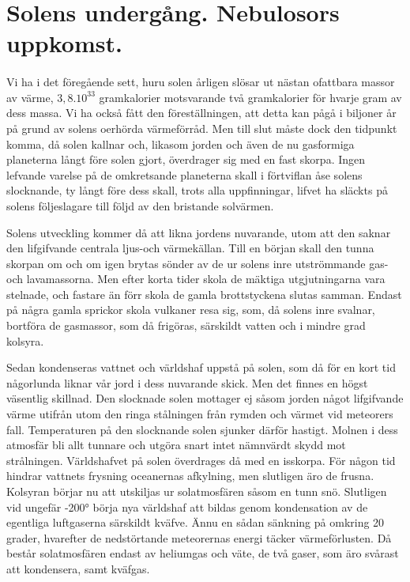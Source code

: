 \documentclass[a4paper, 12pt, oneside, swedish]{article}
\begin{document}
\section{Solens undergång. Nebulosors uppkomst.}
\paragraph{}
Vi ha i det föregående sett, huru solen årligen slösar ut nästan ofattbara massor av värme, $3,8.10^{33}$ gramkalorier motsvarande två gramkalorier för hvarje gram av dess massa. Vi ha också fått den föreställningen, att detta kan pågå i biljoner år på grund av solens oerhörda värmeförråd. Men till slut måste dock den tidpunkt komma, då solen kallnar och, likasom jorden och även de nu gasformiga planeterna långt före solen gjort, överdrager sig med en fast skorpa. Ingen lefvande varelse på de omkretsande planeterna skall i förtviflan åse solens slocknande, ty långt före dess skall, trots alla uppfinningar, lifvet ha släckts på solens följeslagare till följd av den bristande solvärmen.

Solens utveckling kommer då att likna jordens nuvarande, utom att den saknar den lifgifvande centrala ljus-och värmekällan. Till en början skall den tunna skorpan om och om igen brytas sönder av de ur solens inre utströmmande gas- och lavamassorna. Men efter korta tider skola de mäktiga utgjutningarna vara stelnade, och fastare än förr skola de gamla brottstyckena slutas samman. Endast på några gamla sprickor skola vulkaner resa sig, som, då solens inre svalnar, bortföra de gasmassor, som då frigöras, särskildt vatten och i mindre grad kolsyra.

Sedan kondenseras vattnet och världshaf uppstå på solen, som då för en kort tid någorlunda liknar vår jord i dess nuvarande skick. Men det finnes en högst väsentlig skillnad. Den slocknade solen mottager ej såsom jorden något lifgifvande värme utifrån utom den ringa stålningen från rymden och värmet vid meteorers fall. Temperaturen på den slocknande solen sjunker därför hastigt. Molnen i dess atmosfär bli allt tunnare och utgöra snart intet nämnvärdt skydd mot strålningen. Världshafvet på solen överdrages då med en isskorpa. För någon tid hindrar vattnets frysning oceanernas afkylning, men slutligen äro de frusna. Kolsyran börjar nu att utskiljas ur solatmosfären såsom en tunn snö. Slutligen vid ungefär -200° börja nya världshaf att bildas genom kondensation av de egentliga luftgaserna särskildt kväfve. Ännu en sådan sänkning på omkring 20 grader, hvarefter de nedstörtande meteorernas energi täcker värmeförlusten. Då består solatmosfären endast av heliumgas och väte, de två gaser, som äro svårast att kondensera, samt kväfgas.
\end{document}
